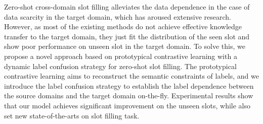Zero-shot cross-domain slot filling alleviates the data dependence in the case of data scarcity in the target domain, which has aroused extensive research. However, as most of the existing methods do not achieve effective knowledge transfer to the target domain, they just fit the distribution of the seen slot and show poor performance on unseen slot in the target domain. To solve this, we propose a novel approach based on prototypical contrastive learning with a dynamic label confusion strategy for zero-shot slot filling. The prototypical contrastive learning aims to reconstruct the semantic constraints of labels, and we introduce the label confusion strategy to establish the label dependence between the source domains and the target domain on-the-fly. Experimental results show that our model achieves significant improvement on the unseen slots, while also set new state-of-the-arts on slot filling task.
